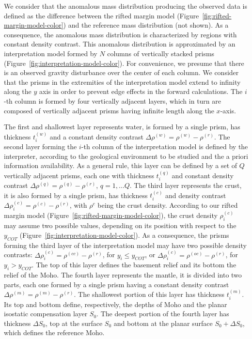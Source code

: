 \documentclass[manuscript]{geophysics}
\begin{document}
We consider that the anomalous mass distribution producing the observed data
is defined as the difference between the rifted margin model 
(Figure~\ref{fig:rifted-margin-model-color}) and the reference mass distribution (not shown).
As a consequence, the anomalous mass distribution is characterized by regions
with constant density contrast.
This anomalous distribution is approximated by an interpretation model 
formed by $N$ columns of vertically stacked prisms 
(Figure~\ref{fig:interpretation-model-color}).
For convenience, we presume that there is an observed gravity disturbance over the
center of each column.
We consider that the prisms in the extremities of the interpretation model extend to
infinity along the $y$ axis in order to prevent edge effects in the forward 
calculations. 
The $i$-th column is formed by four vertically adjacent layers, which in turn are
composed of vertically adjacent prisms having infinite length along the $x$-axis.

The first and shallowest layer represents water, 
is formed by a single prism, has thickness $t^{(w)}_{i}$ and a constant density
contrast $\Delta \rho^{(w)} = \rho^{(w)} - \rho^{(r)}$.
The second layer forming the $i$-th column of the interpretation model is defined by
the interpreter, according to the geological environment to be studied and the a priori
information availability. 
As a general rule, this layer can be defined by a set of $Q$ vertically adjacent
prisms, each one with thickness $t^{(q)}_{i}$ and constant density contrast
$\Delta \rho^{(q)} = \rho^{(q)} - \rho^{(r)}$, $q = 1, \dots Q$.
The third layer represents the crust, it is also formed by a single prism,
has thickness $t^{(c)}_{i}$ and density contrast 
$\Delta \rho^{(c)}_{i} = \rho^{(c)} - \rho^{(r)}$, 
with $\rho^{c}$ being the crust density. 
According to our rifted margin model (Figure~\ref{fig:rifted-margin-model-color}), the crust
density $\rho^{(c)}_{i}$ may assume two possible values, depending on its position
with respect to the $y_{COT}$ (Figure~\ref{fig:interpretation-model-color}).
As a consequence, the prisms forming the third layer of the interpretation model may
have two possible density contrasts: $\Delta \rho^{(c)}_{i} = \rho^{(cc)} - \rho^{(r)}$,
for $y_{i} \le y_{COT}$, or $\Delta \rho^{(c)}_{i} = \rho^{(oc)} - \rho^{(r)}$,
for $y_{i} > y_{COT}$. 
The top of this layer defines the basement relief and its bottom the relief of the
Moho. 
The fourth layer represents the mantle, it is divided into two parts, each one formed
by a single prism having a constant density contrast 
$\Delta \rho^{(m)} = \rho^{(m)} - \rho^{(r)}$. The shallowest
portion of this layer has thickness $t^{(m)}_{i}$. Its top and bottom define,
respectively, the depths of Moho and the planar isostatic compensation layer $S_{0}$.
The deepest portion of the fourth layer has thickness $\Delta S_{0}$, top at the
surface $S_{0}$ and bottom at the planar surface 
$S_{0} + \Delta S_{0}$, which defines the reference Moho. 
\end{document}
